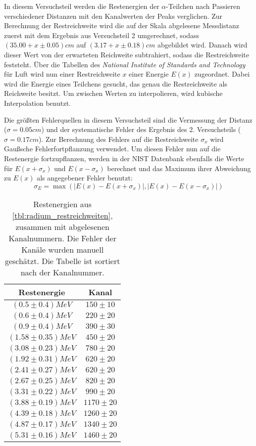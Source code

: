 \documentclass{../Misc/MontavonLaTeX/Montavon}
\begin{document}
In diesem Versuchsteil werden die Restenergien der $\alpha$-Teilchen nach Passieren verschiedener Distanzen mit den Kanalwerten der Peaks verglichen. 
Zur Berechnung der Restreichweite wird die auf der Skala abgelesene Messdistanz zuerst mit dem Ergebnis aus Versuchsteil 2 umgerechnet, sodass $(35.00 + x \pm 0.05) \unit{cm}$ auf $(3.17 + x \pm 0.18) \unit{cm}$ abgebildet wird. Danach wird dieser Wert von der erwarteten Reichweite subtrahiert, sodass die Restreichweite feststeht. Über die Tabellen des \emph{National Institute of Standards and Technology} für Luft \cite{nist_alpha} wird nun einer Restreichweite $x$ einer Energie $E(x)$ zugeordnet. Dabei wird die Energie eines Teilchens gesucht, das genau die Restreichweite als Reichweite besitzt. Um zwischen Werten zu interpolieren, wird kubische Interpolation benutzt. 

Die größten Fehlerquellen in diesem Versuchsteil sind die Vermessung der Distanz ($\sigma = 0.05 \unit{cm}$) und der systematische Fehler des Ergebnis des 2. Versuchsteils ($\sigma = 0.17 \unit{cm}$). Zur Berechnung des Fehlers auf die Restreichweite $\sigma_x$ wird Gaußsche Fehlerfortpflanzung verwendet. Um diesen Fehler nun auf die Restenergie fortzupflanzen, werden in der NIST Datenbank ebenfalls die Werte für $E(x+\sigma_x)$ und $E(x-\sigma_x)$ berechnet und das Maximum ihrer Abweichung zu $E(x)$ als angegebener Fehler benutzt:
\[
	\sigma_E = \max\left(|E(x)-E(x+\sigma_x)|, |E(x)-E(x-\sigma_x)|\right)
\]


\begin{table}[htbp]
\centering
\begin{tabular}{|c|c|}
\hline
Restenergie & Kanal \\
\hline
$(0.5 \pm 0.4) \unit{MeV}$ & $150 \pm 10$ \\
$(0.6 \pm 0.4) \unit{MeV}$ & $220 \pm 20$ \\
$(0.9 \pm 0.4) \unit{MeV}$ & $390 \pm 30$ \\
$(1.58 \pm 0.35) \unit{MeV}$ & $450 \pm 20$ \\
$(3.08 \pm 0.23) \unit{MeV}$ & $780 \pm 20$ \\
$(1.92 \pm 0.31) \unit{MeV}$ & $620 \pm 20$ \\
$(2.41 \pm 0.27) \unit{MeV}$ & $620 \pm 20$ \\
$(2.67 \pm 0.25) \unit{MeV}$ & $820 \pm 20$ \\
$(3.31 \pm 0.22) \unit{MeV}$ & $990 \pm 20$ \\
$(3.88 \pm 0.19) \unit{MeV}$ & $1170 \pm 20$ \\
$(4.39 \pm 0.18) \unit{MeV}$ & $1260 \pm 20$ \\
$(4.87 \pm 0.17) \unit{MeV}$ & $1340 \pm 20$ \\
$(5.31 \pm 0.16) \unit{MeV}$ & $1460 \pm 20$ \\
\hline
\end{tabular}
\caption{Restenergien aus \ref{tbl:radium_restreichweiten}, zusammen mit abgelesenen Kanalnummern. Die Fehler der Kanäle wurden manuell geschätzt. Die Tabelle ist sortiert nach der Kanalnummer.}
\label{tbl:radium_restreichweiten_fit}
\end{table}
\end{document}
